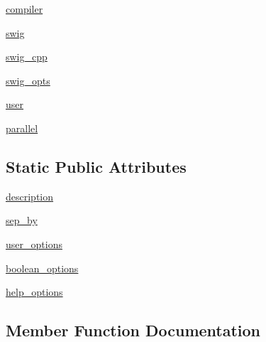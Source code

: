 \begin{DoxyCompactItemize}
\item 
\hyperlink{classsetuptools_1_1__distutils_1_1command_1_1build__ext_1_1build__ext_a7372adc37268463d9d61d196ab6b28f6}{compiler}
\item 
\hyperlink{classsetuptools_1_1__distutils_1_1command_1_1build__ext_1_1build__ext_aef2b51beaf4083bc701c4f4aa5086ca4}{swig}
\item 
\hyperlink{classsetuptools_1_1__distutils_1_1command_1_1build__ext_1_1build__ext_a17fdcc36ab18e6b489b2f39631057c17}{swig\+\_\+cpp}
\item 
\hyperlink{classsetuptools_1_1__distutils_1_1command_1_1build__ext_1_1build__ext_a50bebf6eab50d603b88c0c0bf0ddb720}{swig\+\_\+opts}
\item 
\hyperlink{classsetuptools_1_1__distutils_1_1command_1_1build__ext_1_1build__ext_a65d5d86b8a82e86b55e45d59e74c0128}{user}
\item 
\hyperlink{classsetuptools_1_1__distutils_1_1command_1_1build__ext_1_1build__ext_a21a2c1cc4aa20f25d0b2f703173e360e}{parallel}
\end{DoxyCompactItemize}
\subsection*{Static Public Attributes}
\begin{DoxyCompactItemize}
\item 
\hyperlink{classsetuptools_1_1__distutils_1_1command_1_1build__ext_1_1build__ext_a89b3445cd5d627391078104e784b0abe}{description}
\item 
\hyperlink{classsetuptools_1_1__distutils_1_1command_1_1build__ext_1_1build__ext_a3ac86e004f413acf2be1ca3e09abcc9a}{sep\+\_\+by}
\item 
\hyperlink{classsetuptools_1_1__distutils_1_1command_1_1build__ext_1_1build__ext_aeff1a9badf64027589a1f30117823b33}{user\+\_\+options}
\item 
\hyperlink{classsetuptools_1_1__distutils_1_1command_1_1build__ext_1_1build__ext_a227773bb9a0a59d1910370e729b5e7f3}{boolean\+\_\+options}
\item 
\hyperlink{classsetuptools_1_1__distutils_1_1command_1_1build__ext_1_1build__ext_a47934631df63852ff12f5c446c721464}{help\+\_\+options}
\end{DoxyCompactItemize}


\subsection{Member Function Documentation}
\mbox{\label{classsetuptools_1_1__distutils_1_1command_1_1build__ext_1_1build__ext_a30e4b74b5abc9049d3f6abcf4280204d}} 
